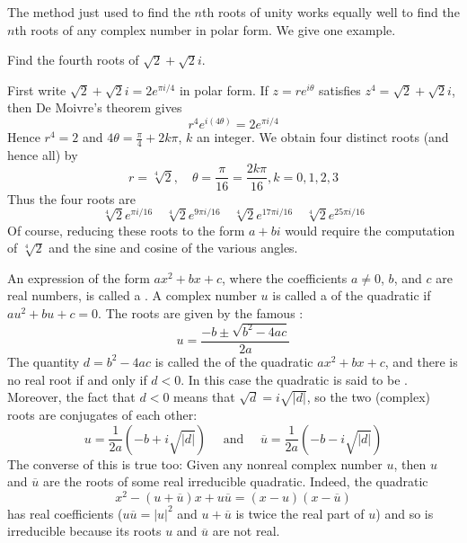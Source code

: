 \documentclass{ximera}
\begin{document}
The method just used to find the $n$th roots of unity works equally well to find the $n$th roots of any complex number in polar form. We give one example.

\begin{example}\label{ex:034148}
Find the fourth roots of $\sqrt{2} + \sqrt{2}i$.

\begin{explanation}
  First write $\sqrt{2} + \sqrt{2}i = 2e^{\pi i/4}$ in polar form. If $z = re^{i\theta}$ satisfies $z^{4} = \sqrt{2} + \sqrt{2}i$, then De Moivre's theorem gives
\begin{equation*}
r^4e^{i(4\theta)} = 2e^{\pi i/4}
\end{equation*}
Hence $r^{4} = 2$ and $4\theta = \frac{\pi}{4} + 2k\pi$, $k$ an integer. We obtain four distinct roots (and hence all) by
\begin{equation*}
r = \sqrt[4]{2}, \quad \theta = \frac{\pi}{16} = \frac{2k\pi}{16}, k=0, 1, 2, 3
\end{equation*}
Thus the four roots are
\begin{equation*}
\sqrt[4]{2} e^{\pi i/16} \quad  \sqrt[4]{2} e^{9\pi i/16} \quad \sqrt[4]{2} e^{17 \pi i/16} \quad \sqrt[4]{2} e^{25\pi i/16}
\end{equation*}
Of course, reducing these roots to the form $a + bi$ would require the computation of $\sqrt[4]{2}$
 and the sine and cosine of the various angles.
\end{explanation}
\end{example}

An expression of the form $ax^{2} + bx + c$, where the coefficients $a \neq 0$, $b$, and $c$ are real numbers, is called a . A complex number $u$ is called a  of the quadratic if $au^{2} + bu + c = 0$. The roots are given by the famous :
\begin{equation*}
u = \frac{-b \pm \sqrt{b^2 - 4ac}}{2a}
\end{equation*}
The quantity $d = b^{2} - 4ac$ is called the  of the quadratic $ax^{2} + bx + c$, and there is no real root if and only if $d < 0$. In this case the quadratic is said to be . Moreover, the fact that $d < 0$ means that $\sqrt{d} = i\sqrt{|d|}$, so the two (complex) roots are conjugates of each other:
\begin{equation*}
u = \frac{1}{2a}(-b+i\sqrt{|d|}) \quad \mbox{ and } \quad \overline{u} = \frac{1}{2a}(-b-i\sqrt{|d|})
\end{equation*}
The converse of this is true too: Given any nonreal complex number $u$, then $u$ and $\overline{u}$
 are the roots of some real irreducible quadratic. Indeed, the quadratic
\begin{equation*}
x^2 - (u + \overline{u})x + u \overline{u} = (x-u)(x-\overline{u})
\end{equation*}
has real coefficients ($u\overline{u} = |u|^{2}$ and $u + \overline{u}$
 is twice the real part of $u$) and so is irreducible because its roots $u$ and $\overline{u}$
 are not real.
\end{document}
